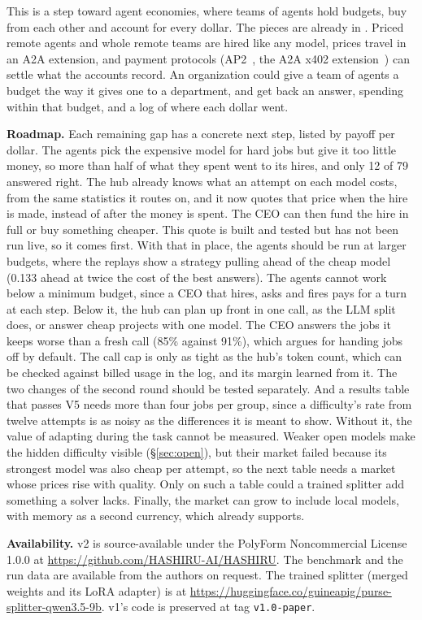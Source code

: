 This is a step toward agent economies, where teams of agents hold budgets, buy from each other and account for every
dollar. The pieces are already in \sys{}. Priced remote agents and whole remote teams are hired like any model, prices
travel in an A2A extension, and payment protocols (AP2~\cite{google2026agent}, the A2A x402
extension~\cite{googleagenticcommerce2025a2a}) can settle what the accounts record. An organization could give a team of
agents a budget the way it gives one to a department, and get back an answer, spending within that budget, and a log of
where each dollar went.

\textbf{Roadmap.} Each remaining gap has a concrete next step, listed by payoff per dollar. The agents pick the
expensive model for hard jobs but give it too little money, so more than half of what they spent went to its hires, and
only 12 of 79 answered right. The hub already knows what an attempt on each model costs, from the same statistics it
routes on, and it now quotes that price when the hire is made, instead of after the money is spent. The CEO can then
fund the hire in full or buy something cheaper. This quote is built and tested but has not been run live, so it comes
first. With that in place, the agents should be run at larger budgets, where the
replays show a strategy pulling ahead of the cheap model (0.133 ahead at twice the cost of the best answers). The agents
cannot work below a minimum budget, since a CEO that hires, asks and fires pays for a turn at each step. Below it, the
hub can plan up front in one call, as the LLM split does, or answer cheap projects with one model. The CEO answers the
jobs it keeps worse than a fresh call (85\% against 91\%), which argues for handing jobs off by default. The call cap is
only as tight as the hub's token count, which can be checked against billed usage in the log, and its margin learned
from it. The two changes of the second round should be tested separately. And a results table that passes V5 needs
more than four jobs per group, since a difficulty's rate from twelve attempts is as noisy as the differences it is
meant to show. Without it, the value of adapting during the task cannot be measured. Weaker open models make the
hidden difficulty visible (\S\ref{sec:open}), but their market failed because its strongest model was also cheap per
attempt, so the next table needs a market whose prices rise with quality. Only on such a table could a trained splitter
add something a solver lacks. Finally, the market can grow to include local models, with memory as a second currency,
which \sys{} already supports.

\textbf{Availability.} \sys{} v2 is source-available under the PolyForm Noncommercial License 1.0.0 at
\url{https://github.com/HASHIRU-AI/HASHIRU}. The benchmark and the run data are available from the authors on request.
The trained splitter (merged weights and its LoRA adapter) is at
\url{https://huggingface.co/guineapig/purse-splitter-qwen3.5-9b}.
\sys{} v1's code is preserved at tag \texttt{v1.0-paper}.
